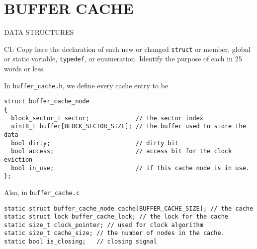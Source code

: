 \section*{BUFFER CACHE}

\begin{aspect}{DATA STRUCTURES}
  \begin{qc}
    C1: Copy here the declaration of each new or changed \lstinline{struct} or member,
    global or static variable, \lstinline{typedef}, or enumeration.
    Identify the purpose of each in 25 words or less.
  \end{qc}
  In \texttt{buffer\_cache.h}, we define every cache entry to be
  \begin{lstlisting}
struct buffer_cache_node
{
  block_sector_t sector;             // the sector index
  uint8_t buffer[BLOCK_SECTOR_SIZE]; // the buffer used to store the data
  bool dirty;                        // dirty bit
  bool access;                       // access bit for the clock eviction
  bool in_use;                       // if this cache node is in use.
};
  \end{lstlisting}
  Also, in \texttt{buffer\_cache.c}
  \begin{lstlisting}
static struct buffer_cache_node cache[BUFFER_CACHE_SIZE]; // the cache
static struct lock buffer_cache_lock; // the lock for the cache
static size_t clock_pointer; // used for clock algorithm
static size_t cache_size; // the number of nodes in the cache.
static bool is_closing;   // closing signal
\end{lstlisting}
\end{aspect}


